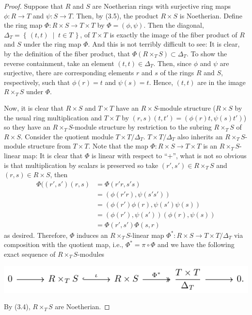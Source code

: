 \begin{proof}
Suppose that $R$ and $S$ are Noetherian rings with surjective
ring maps $\phi\colon R\to T$ and $\psi\colon S\to T$. Then, by
(3.5), the product $R\times S$ is Noetherian. Define the ring map
$\Phi\colon R\times S\to T\times T$ by $\Phi=(\phi,\psi)$. Then
the diagonal, $\Delta_T=\left\{\,(t,t)\;\middle|\; t\in
  T\,\right\}$, of $T\times T$ is exactly the image of the fiber
product of $R$ and $S$ under the ring map $\Phi$. And this is not
terribly difficult to see: It is clear, by the definition of the
fiber product, that $\Phi(R\times_T S)\subset\Delta_T$. To show
the reverse containment, take an element
$(t,t)\in\Delta_T$. Then, since $\phi$ and $\psi$ are surjective,
there are corresponding elements $r$ and $s$ of the rings $R$ and
$S$, respectively, such that $\phi(r)=t$ and $\psi(s)=t$. Hence,
$(t,t)$ are in the image $R\times_T S$ under $\Phi$.

Now, it is clear that $R\times S$ and $T\times T$ have an
$R\times S$-module structure ($R\times S$ by the usual ring
multiplication and $T\times T$ by
$(r,s)(t,t')=(\phi(r)t,\psi(s)t')$) so they have an $R\times_T
S$-module structure by restriction to the subring $R\times_T S$
of $R\times S$. Consider the quotient module $T\times
T/\Delta_T$. $T\times T/\Delta_T$ also inherits an $R\times_T
S$-module structure from $T\times T$. Note that the map
$\Phi\colon R\times S\to T\times T$ is an $R\times_T S$-linear
map: It is clear that $\Phi$ is linear with respect to ``$+$'', what
is not so obvious is that multiplication by scalars is preserved
so take $(r',s')\in R\times_T S$ and $(r,s)\in R\times S$, then
\begin{align*}
\Phi((r',s')(r,s)&=
\Phi(r'r,s's)\\
&=(\phi(r'r),\psi(s's'))\\
&=(\phi(r')\phi(r),\psi(s')\psi(s))\\
&=(\phi(r'),\psi(s'))(\phi(r),\psi(s))\\
&=\Phi(r',s')\Phi(s,r)
\end{align*}
as desired. Therefore, $\Phi$ induces an $R\times_T S$-linear map
$\Phi^*\colon R\times S\to T\times T/\Delta_T$ via composition
with the quotient map, i.e., $\Phi^*=\pi\circ\Phi$ and we have
the following exact sequence of $R\times_T S$-modules
\begin{center}
\includegraphics{figures/ps4-p2-short-exact-seq}
\end{center}
By (3.4), $R\times_T S$ are Noetherian.
\end{proof}

